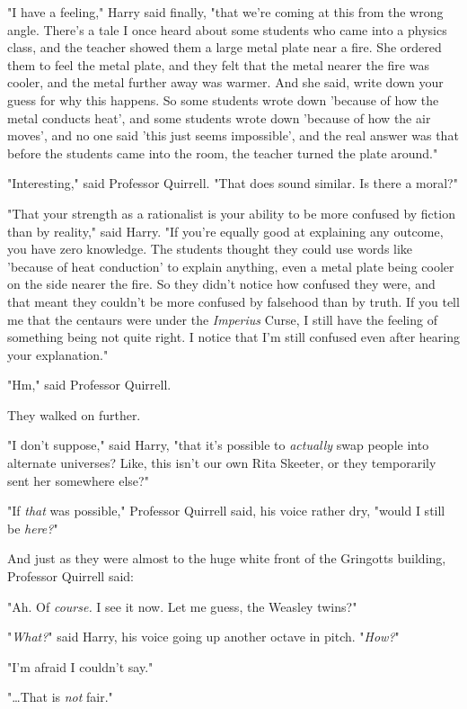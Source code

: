 "I have a feeling," Harry said finally, "that we're coming at this from the 
wrong angle. There's a tale I once heard about some students who came into a 
physics class, and the teacher showed them a large metal plate near a fire. She 
ordered them to feel the metal plate, and they felt that the metal nearer the 
fire was cooler, and the metal further away was warmer. And she said, write 
down your guess for why this happens. So some students wrote down 'because of 
how the metal conducts heat', and some students wrote down 'because of how the 
air moves', and no one said 'this just seems impossible', and the real answer 
was that before the students came into the room, the teacher turned the plate 
around."

"Interesting," said Professor Quirrell. "That does sound similar. Is there a 
moral?"

"That your strength as a rationalist is your ability to be more confused by 
fiction than by reality," said Harry. "If you're equally good at explaining any 
outcome, you have zero knowledge. The students thought they could use words 
like 'because of heat conduction' to explain anything, even a metal plate being 
cooler on the side nearer the fire. So they didn't notice how confused they 
were, and that meant they couldn't be more confused by falsehood than by truth. 
If you tell me that the centaurs were under the \emph{Imperius} Curse, I still 
have the feeling of something being not quite right. I notice that I'm still 
confused even after hearing your explanation."

"Hm," said Professor Quirrell.

They walked on further.

"I don't suppose," said Harry, "that it's possible to \emph{actually} swap 
people into alternate universes? Like, this isn't our own Rita Skeeter, or they 
temporarily sent her somewhere else?"

"If \emph{that} was possible," Professor Quirrell said, his voice rather dry, 
"would I still be \emph{here?}"

And just as they were almost to the huge white front of the Gringotts building, 
Professor Quirrell said:

"Ah. Of \emph{course.} I see it now. Let me guess, the Weasley twins?"

"\emph{What?}" said Harry, his voice going up another octave in pitch. 
"\emph{How?}"

"I'm afraid I couldn't say."

"{\ldots}That is \emph{not} fair."

